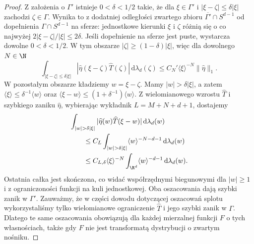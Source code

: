 \begin{proof}
Z założenia o $\Gamma'$ istnieje $0<\delta<1/2$
takie, że dla $\xi\in\Gamma'$ i
$|\xi-\zeta|\le\delta|\xi|$ zachodzi $\zeta\in\Gamma$.
Wynika to z dodatniej odległości zwartego zbioru
$\overline{\Gamma'}\cap S^{d-1}$ od dopełnienia
$\Gamma\cap S^{d-1}$ na sferze: jednostkowe
kierunki $\xi$ i $\zeta$ różnią się o co najwyżej
$2|\xi-\zeta|/|\xi|\le2\delta$.
Jeśli dopełnienie na sferze jest puste,
wystarcza dowolne $0<\delta<1/2$.
W tym obszarze $|\zeta|\ge(1-\delta)|\xi|$,
więc dla dowolnego $N\in\N$
\[
 \int_{|\xi-\zeta|\le\delta|\xi|}
 |\widehat\eta(\xi-\zeta)\widehat T(\zeta)|
 \,\mathrm d\lambda_d(\zeta)
 \le C_N'\langle\xi\rangle^{-N}\|\widehat\eta\|_1 .
\]
W pozostałym obszarze kładziemy $w=\xi-\zeta$.
Mamy $|w|>\delta|\xi|$, a zatem
$\langle\xi\rangle\le\delta^{-1}\langle w\rangle$
oraz $\langle\xi-w\rangle\le(1+\delta^{-1})\langle w\rangle$.
Z wielomianowego wzrostu $\widehat T$ i szybkiego
zaniku $\widehat\eta$, wybierając wykładnik
$L=M+N+d+1$, dostajemy
\[
 \begin{aligned}
 &\int_{|w|>\delta|\xi|}
 |\widehat\eta(w)\widehat T(\xi-w)|
 \,\mathrm d\lambda_d(w)\\
 &\qquad\le C_L\int_{|w|>\delta|\xi|}
 \langle w\rangle^{-N-d-1}\,\mathrm d\lambda_d(w)\\
 &\qquad\le C_{L,\delta}\langle\xi\rangle^{-N}
 \int_{\R^d}\langle w\rangle^{-d-1}\,\mathrm d\lambda_d(w).
 \end{aligned}
\]
Ostatnia całka jest skończona, co widać
współrzędnymi biegunowymi dla $|w|\ge1$
i z ograniczoności funkcji na kuli jednostkowej.
Oba oszacowania dają szybki zanik w $\Gamma'$.
Zauważmy, że w części dowodu dotyczącej oszacowań
splotu wykorzystaliśmy tylko wielomianowe ograniczenie
$\widehat T$ i jego szybki zanik w $\Gamma$.
Dlatego te same oszacowania obowiązują dla każdej
mierzalnej funkcji $F$ o tych własnościach,
także gdy $F$ nie jest transformatą dystrybucji
o zwartym nośniku.
\end{proof}

